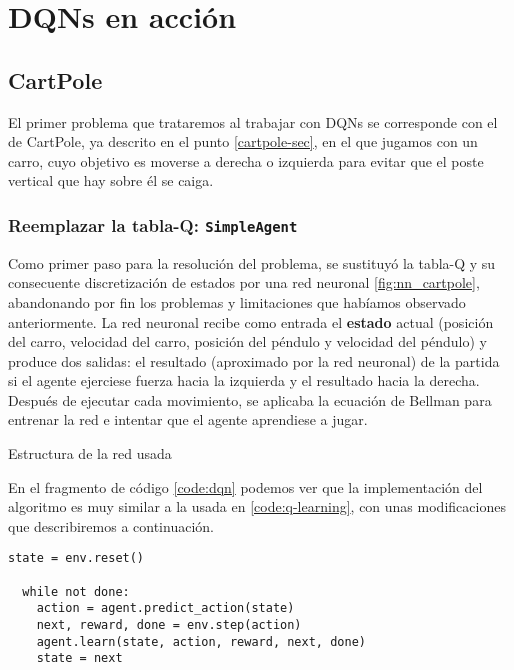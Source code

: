 \chapter{DQNs en acción}
\label{cap:dqnEnAccion}



\section{CartPole}
\label{sec:cartpoleDQN}

El primer problema que trataremos al trabajar con DQNs se corresponde con el de CartPole, ya descrito en el punto \ref{cartpole-sec}, en el que jugamos con un carro, cuyo objetivo es moverse a derecha o izquierda para evitar que el poste vertical que hay sobre él se caiga.


\subsection{Reemplazar la tabla-Q: \texttt{SimpleAgent}}

Como primer paso para la resolución del problema, se sustituyó la tabla-Q y su consecuente discretización de estados por una red neuronal \ref{fig:nn_cartpole}, abandonando por fin los problemas y limitaciones que habíamos observado anteriormente. La red neuronal recibe como entrada el \textbf{estado} actual (posición del carro, velocidad del carro, posición del péndulo y velocidad del péndulo) y produce dos salidas: el resultado (aproximado por la red neuronal) de la partida si el agente ejerciese fuerza hacia la izquierda y el resultado hacia la derecha. Después de ejecutar cada movimiento, se aplicaba la ecuación de Bellman para entrenar la red e intentar que el agente aprendiese a jugar.

%
       {Estructura de la red usada}

En el fragmento de código \ref{code:dqn} podemos ver que la implementación del algoritmo es muy similar a la usada en \ref{code:q-learning}, con unas modificaciones que describiremos a continuación.

\begin{minipage}{0.9\linewidth}%
\begin{lstlisting}[frame=tb, caption=Pseudocódigo SimpleAgent, inputencoding=latin1, label=code:dqn]      
  state = env.reset()

  while not done:
    action = agent.predict_action(state)
    next, reward, done = env.step(action)
    agent.learn(state, action, reward, next, done)
    state = next
        
\end{lstlisting}%
\end{minipage}


